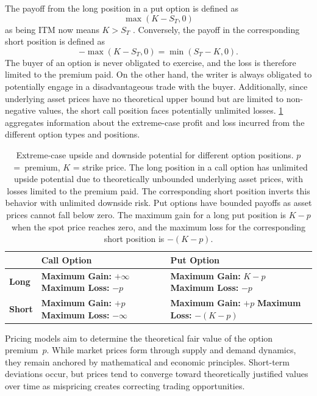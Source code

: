 \documentclass[english,12pt,a4paper,pdftex,sci,utf8]{aaltothesis}
\begin{document}
The payoff from the long position in a put option is defined as
\begin{equation}
    \max(K-S_T,0)
\label{eq:long_put_payoff}
\end{equation}
as being ITM now means $K > S_T$ \cite{hull2016options}. Conversely, the payoff in the corresponding short position is defined as
\begin{equation*}
    -\max(K-S_T,0) = \min(S_T-K,0).
\end{equation*}
The buyer of an option is never obligated to exercise, and the loss is therefore limited to the premium paid. On the other hand, the writer is always obligated to potentially engage in a disadvantageous trade with the buyer. Additionally, since underlying asset prices have no theoretical upper bound but are limited to non-negative values, the short call position faces potentially unlimited losses. \cref{tab:options_table} aggregates information about the extreme-case profit and loss incurred from the different option types and positions.

\begin{table}[!htb]
\centering
\caption{Extreme-case upside and downside potential for different option positions. \mbox{$p$ = premium}, $K$ = strike price. The long position in a call option has unlimited upside potential due to theoretically unbounded underlying asset prices, with losses limited to the premium paid. The corresponding short position inverts this behavior with unlimited downside risk. Put options have bounded payoffs as asset prices cannot fall below zero. The maximum gain for a long put position is $K-p$ when the spot price reaches zero, and the maximum loss for the corresponding short position is $-(K-p)$.}\label{tab:options_table}
\begin{tabular}{|l|p{5cm}|p{5cm}|}
\hline
\textbf{} & \textbf{Call Option} & \textbf{Put Option} \\
\hline
\textbf{Long} & \textbf{Maximum Gain:} $+\infty$
\newline \textbf{Maximum Loss:} $-p$ & \textbf{Maximum Gain:} $K-p$
\newline \textbf{Maximum Loss:} $-p$ \\
\hline
\textbf{Short} & \textbf{Maximum Gain:} $+p$
\newline \textbf{Maximum Loss:} $-\infty$ & \textbf{Maximum Gain:} $+p$
\newline \textbf{Maximum Loss:} $-(K-p)$ \\
\hline
\end{tabular}
\end{table}
Pricing models aim to determine the theoretical fair value of the option \mbox{premium $p$.} While market prices form through supply and demand dynamics, they remain anchored by mathematical and economic principles. Short-term deviations occur, but prices tend to converge toward theoretically justified values over time as mispricing creates correcting trading opportunities.
\clearpage
\end{document}

